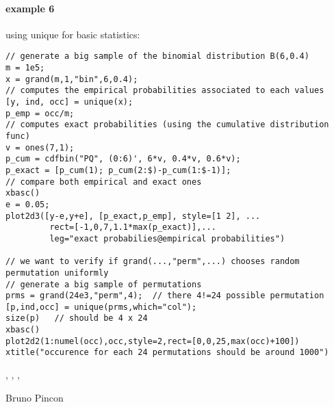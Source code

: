 \begin{examples}
\paragraph{example 6} using unique for basic statistics:
\begin{Verbatim}
// generate a big sample of the binomial distribution B(6,0.4)
m = 1e5;
x = grand(m,1,"bin",6,0.4); 
// computes the empirical probabilities associated to each values
[y, ind, occ] = unique(x);
p_emp = occ/m;
// computes exact probabilities (using the cumulative distribution func)
v = ones(7,1);
p_cum = cdfbin("PQ", (0:6)', 6*v, 0.4*v, 0.6*v);
p_exact = [p_cum(1); p_cum(2:$)-p_cum(1:$-1)];
// compare both empirical and exact ones
xbasc()
e = 0.05;
plot2d3([y-e,y+e], [p_exact,p_emp], style=[1 2], ...
         rect=[-1,0,7,1.1*max(p_exact)],...
         leg="exact probabilies@empirical probabilities")

// we want to verify if grand(...,"perm",...) chooses random permutation uniformly
// generate a big sample of permutations
prms = grand(24e3,"perm",4);  // there 4!=24 possible permutation 
[p,ind,occ] = unique(prms,which="col");
size(p)   // should be 4 x 24
xbasc()
plot2d2(1:numel(occ),occ,style=2,rect=[0,0,25,max(occ)+100])
xtitle("occurence for each 24 permutations should be around 1000")
\end{Verbatim}

\end{examples}

\begin{manseealso}
  , , ,   
\end{manseealso}

\begin{authors}
  Bruno Pincon
\end{authors}
